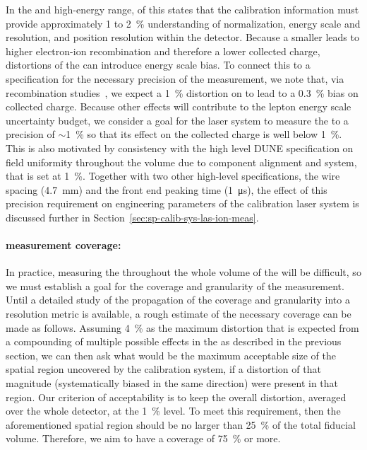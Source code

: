 In the  and high-energy range, \physchlbl of this 
states that the calibration information must provide approximately \num{1} to \SI{2}{\%} understanding of normalization, energy scale and resolution, and position resolution within the detector.
Because a smaller \efield leads to higher electron-ion recombination and therefore a lower collected charge, distortions of the \efield can introduce
energy scale bias. To connect this
to a specification for the necessary precision of the \efield measurement, we note that, via recombination studies~\cite{bib:mooney2018}, we expect a \SI{1}{\%} distortion on \efield to lead to a \SI{0.3}{\%} bias on collected charge.
Because other effects will contribute to the lepton energy scale uncertainty budget, we consider a goal for the 
laser system to measure the \efield to a precision of $\sim$\SI{1}{\%} so that its effect on the collected charge is well below \SI{1}{\%}.
This is also motivated by consistency with the high level DUNE specification on field uniformity throughout the volume due to component alignment and  system, that 
is set at \SI{1}{\%}.
Together with two other high-level  specifications, the  wire spacing (\SI{4.7}{\mm}) and the front end peaking time (\SI{1}{\micro\s}), the effect of this \efield precision requirement on engineering parameters of the calibration laser system is discussed further %
in Section~\ref{sec:sp-calib-sys-las-ion-meas}.

\paragraph{\efield measurement coverage:}

In practice, measuring the \efield  throughout the whole volume
of the  will be difficult, 
so we must establish a goal for the coverage and granularity of the measurement. 
Until a detailed study of the propagation of the coverage and granularity into a resolution metric is available, 
a rough estimate of the necessary coverage can be made as follows.
Assuming \SI{4}{\%} as the maximum \efield distortion %
that is %
expected from a compounding of multiple possible effects in the   %
as described in the previous section,
we can then ask what would be the maximum acceptable size of the spatial region uncovered by the calibration system, if a distortion of that magnitude (systematically biased in the same direction) were present in that region. Our criterion of acceptability is to keep the overall \efield distortion, averaged over the whole detector, at the \SI{1}{\%} level. 
To meet this requirement, then the aforementioned spatial region should be no larger than \SI{25}{\%} of the total fiducial volume. Therefore, we aim to have a coverage of \SI{75}{\%} or more.

